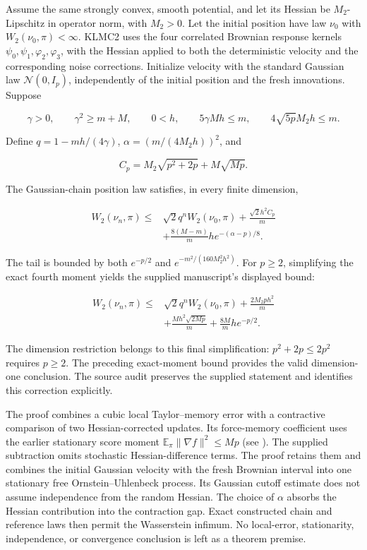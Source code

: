 \documentclass[11pt,a4paper]{report}
\begin{document}
Assume the same strongly convex, smooth potential, and let its Hessian be \(M_2\)-Lipschitz in operator norm, with \(M_2>0\). Let the initial position have law \(\nu_0\) with \(W_2(\nu_0,\pi)<\infty\). KLMC2 uses the four correlated Brownian response kernels \(\psi_0,\psi_1,\varphi_2,\varphi_3\), with the Hessian applied to both the deterministic velocity and the corresponding noise corrections. Initialize velocity with the standard Gaussian law \(\mathcal N(0,I_p)\), independently of the initial position and the fresh innovations. Suppose


\[\gamma>0,\qquad\gamma^2\ge m+M,\qquad0<h,\qquad5\gamma Mh\le m,\qquad4\sqrt{5p}M_2h\le m.\]


Define \(q=1-mh/(4\gamma)\), \(\alpha=(m/(4M_2h))^2\), and


\[C_p=M_2\sqrt{p^2+2p}+M\sqrt{Mp}.\]


The Gaussian-chain position law satisfies, in every finite dimension,


\[\boxed{\begin{aligned}W_2(\nu_n,\pi)\le{}&\sqrt2q^nW_2(\nu_0,\pi)+\frac{\sqrt2h^2C_p}{m}\\&+\frac{8(M-m)}m h e^{-(\alpha-p)/8}.\end{aligned}}\]


The tail is bounded by both \(e^{-p/2}\) and \(e^{-m^2/(160M_2^2h^2)}\). For \(p\ge2\), simplifying the exact fourth moment yields the supplied manuscript’s displayed bound:


\[\begin{aligned}W_2(\nu_n,\pi)\le{}&\sqrt2q^nW_2(\nu_0,\pi)+\frac{2M_2ph^2}{m}\\&+\frac{Mh^2\sqrt{2Mp}}m+\frac{8M}m h e^{-p/2}.\end{aligned}\]


The dimension restriction belongs to this final simplification: \(p^2+2p\le2p^2\) requires \(p\ge2\). The preceding exact-moment bound provides the valid dimension-one conclusion. The source audit preserves the supplied statement and identifies this correction explicitly.




The proof combines a cubic local Taylor–memory error with a contractive comparison of two Hessian-corrected updates. Its force-memory coefficient uses the earlier stationary score moment \(\mathbb E_\pi\|\nabla f\|^2\le Mp\) (see \cite[Section~3.27.8]{LangevinLean2026ULASC}). The supplied subtraction omits stochastic Hessian-difference terms. The proof retains them and combines the initial Gaussian velocity with the fresh Brownian interval into one stationary free Ornstein–Uhlenbeck process. Its Gaussian cutoff estimate does not assume independence from the random Hessian. The choice of \(\alpha\) absorbs the Hessian contribution into the contraction gap. Exact constructed chain and reference laws then permit the Wasserstein infimum. No local-error, stationarity, independence, or convergence conclusion is left as a theorem premise.
\end{document}

